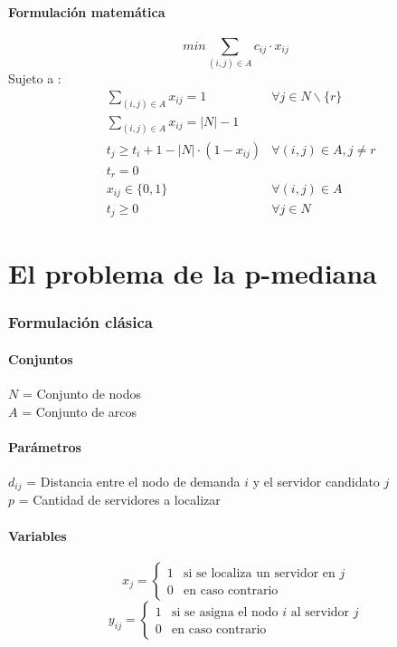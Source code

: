 \documentclass{article}
\numberwithin{equation}{section}
\begin{document}
\subsection{Formulación matemática}
\begin{equation}
min \sum_{(i,j) \in A} c_{ij} \cdot x_{ij}
\end{equation}
Sujeto a : \begin{align}
& \sum_{(i,j) \in A} x_{ij} = 1 &\forall j \in N \backslash \{r\}\\
& \sum_{(i,j) \in A} x_{ij} = |N| - 1\\
& t_{j} \geq t_{i} + 1 - |N| \cdot (1 - x_{ij}) &\forall (i,j) \in A, j \neq r\\
& t_{r} = 0\\
& x_{ij} \in \{0,1\} &\forall (i,j) \in A\\
& t_{j} \geq 0 &\forall j \in N
\end{align}

\newpage
\part{El problema de la p-mediana}
\section{Formulación clásica}
\subsection{Conjuntos}
$N$ = Conjunto de nodos\\
$A$ = Conjunto de arcos
\subsection{Parámetros}
$d_{ij}$ = Distancia entre el nodo de demanda $i$ y el servidor candidato $j$\\
$p$ = Cantidad de servidores a localizar
\subsection{Variables}
\begin{center}
\[x_{j}={\begin{cases}1&{\mbox{si se localiza un servidor en $j$}}\\0&{\mbox{en caso contrario}}\end{cases}}
\]
\[y_{ij}={\begin{cases}1&{\mbox{si se asigna el nodo $i$ al servidor $j$}}\\0&{\mbox{en caso contrario}}\end{cases}}
\]
\end{center}
\end{document}
